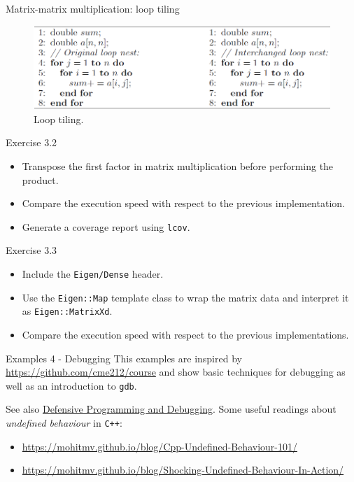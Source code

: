 \documentclass[10pt]{beamer}
\begin{document}
\begin{frame}{Matrix-matrix multiplication: loop tiling}
    \begin{figure}
        \centering
        \includegraphics[width=\textwidth]{images/loop_tiling.png}
        \caption{Loop tiling.}
    \end{figure}
\end{frame}

\begin{frame}{Exercise 3.2}
    \begin{itemize}
        \item Transpose the first factor in matrix multiplication before performing the product.
        \item Compare the execution speed with respect to the previous implementation.
        \item Generate a coverage report using \texttt{lcov}.
    \end{itemize}
\end{frame}

\begin{frame}{Exercise 3.3}
    \begin{itemize}
        \item Include the \texttt{Eigen/Dense} header.
        \item Use the \texttt{Eigen::Map} template class to wrap the matrix data and interpret it as \texttt{Eigen::MatrixXd}.
        \item Compare the execution speed with respect to the previous implementations.
    \end{itemize}
\end{frame}

\begin{frame}{Examples 4 - Debugging}
This examples are inspired by \url{https://github.com/cme212/course}
and show basic techniques for debugging as well as an introduction to \texttt{gdb}.

See also \href{https://gjbex.github.io/DPD-online-book/}{Defensive Programming and Debugging}.
\vfill
Some useful readings about \textit{undefined behaviour} in \texttt{C++}:
\begin{itemize}
\item \url{https://mohitmv.github.io/blog/Cpp-Undefined-Behaviour-101/}
\item \url{https://mohitmv.github.io/blog/Shocking-Undefined-Behaviour-In-Action/}
\end{itemize}
\end{frame}
\end{document}
